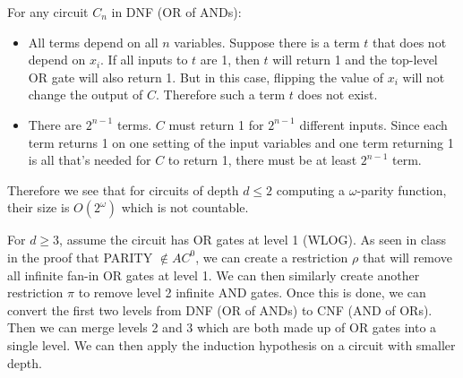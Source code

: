 \documentclass{article}
\begin{document}
For any circuit $C_n$ in DNF (OR of ANDs):
\begin{itemize}
\item All terms depend on all $n$ variables. Suppose there is a term $t$ that does not depend on $x_i$. If all inputs to $t$ are 1, then $t$ will return 1 and the top-level OR gate will also return 1. But in this case, flipping the value of $x_i$ will not change the output of $C$. Therefore such a term $t$ does not exist.
\item There are $2^{n-1}$ terms. $C$ must return 1 for $2^{n-1}$ different inputs. Since each term returns 1 on one setting of the input variables and one term returning 1 is all that's needed for $C$ to return 1, there must be at least $2^{n-1}$ term.
\end{itemize}

Therefore we see that for circuits of depth $d \leq 2$ computing a $\omega$-parity function, their size is $O(2^\omega)$ which is not countable.

For $d \geq 3$, assume the circuit has OR gates at level 1 (WLOG). As seen in class in the proof that PARITY $\not\in AC^0$, we can create a restriction $\rho$ that will remove all infinite fan-in OR gates at level 1. We can then similarly create another restriction $\pi$ to remove level 2 infinite AND gates. Once this is done, we can convert the first two levels from DNF (OR of ANDs) to CNF (AND of ORs). Then we can merge levels 2 and 3 which are both made up of OR gates into a single level. We can then apply the induction hypothesis on a circuit with smaller depth.
\end{document}
